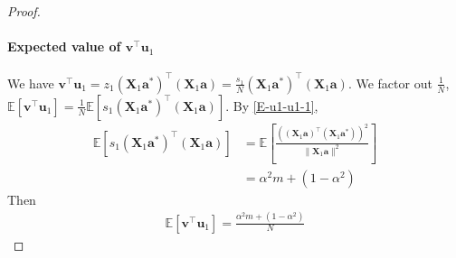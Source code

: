\documentclass{article}
\theoremstyle{plain}
\theoremstyle{definition}
\theoremstyle{remark}
\begin{document}
\begin{proof}
    \paragraph{Expected value of $\mathbf{v}^\top \mathbf{u}_1$} We have $\mathbf{v}^\top \mathbf{u}_1 = z_1 (\mathbf{X}_1 \mathbf{a}^*)^\top (\mathbf{X}_1 \mathbf{a})= \frac{s_1}{N}(\mathbf{X}_1 \mathbf{a}^*)^\top (\mathbf{X}_1 \mathbf{a})$. We factor out $\frac{1}{N}$, $\mathbb{E}\left[ \mathbf{v}^\top \mathbf{u}_1\right]=\frac{1}{N}\mathbb{E}\left[ s_1 (\mathbf{X}_1 \mathbf{a}^*)^\top (\mathbf{X}_1 \mathbf{a})\right]$. By \eqref{E-u1-u1-1},
    \begin{align}
        \mathbb{E}\left[ s_1 (\mathbf{X}_1 \mathbf{a}^*)^\top (\mathbf{X}_1 \mathbf{a})\right] & = \mathbb{E}\left[\frac{((\mathbf{X}_1 \mathbf{a})^\top(\mathbf{X}_1 \mathbf{a}^*))^2}{\|  \mathbf{X}_1 \mathbf{a} \|^2} \right] \\
        & = \alpha^2m + (1-\alpha^2)
    \end{align}
Then 
\begin{align}
    \mathbb{E}\left[ \mathbf{v}^\top \mathbf{u}_1\right]= \frac{\alpha^2m + (1-\alpha^2)}{N} \label{v-u1}
\end{align}

    

\end{proof}
\end{document}
